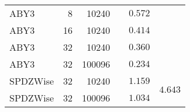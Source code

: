 \documentclass[a4paper,11pt,
]{article}
\newcommand{\cmark}{\ding{51}}%
\newcommand{\xmark}{\ding{55}}%
\begin{document}
\begin{table}[ht]
\begin{tabular}{lrrcrr}
        ABY3                         & 8                           & 10240                          & \xmark                        & $0.572$                     &                          \\
        ABY3                         & 16                          & 10240                          & \xmark                        & $0.414$                     &                          \\
        ABY3                         & 32                          & 10240                          & \xmark                        & $0.360$                     &                          \\
        ABY3                         & 32                          & 100096                         & \xmark                        & $0.234$                     &                          \\
        \midrule
        SPDZWise                     & 32                          & 10240                          & \cmark                        & $1.159$                     & \multirow{2}{*}{$4.643$} \\
        SPDZWise                     & 32                          & 100096                         & \cmark                        & $1.034$                     &                          \\
        \bottomrule
    \end{tabular}
\end{table}
\end{document}
